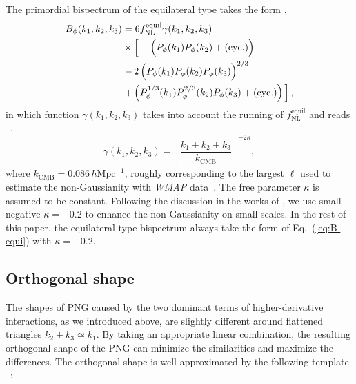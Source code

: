 \documentclass[twocolumn,floatfix,nofootinbib,aps,reprint]{revtex4}
\begin{document}
The primordial bispectrum 
of the equilateral type takes the form \cite{2006JCAP...05..004C},
\begin{equation}
    \begin{split}
        B_\phi(k_1, k_2, k_3) &= 6 f_\mathrm{NL}^\mathrm{equil}
        \gamma(k_1, k_2, k_3)\vphantom{P^{2/3}}\\
        &\times\left[\vphantom{P^{2/3}}
        -\left(\vphantom{P^{2/3}}
        P_\phi(k_1)P_\phi(k_2) + (\mathrm{cyc.})\right)
        \right.\\
        &\left. 
        -\,2\left(\vphantom{P^{2/3}}
        P_\phi(k_1)P_\phi(k_2)P_\phi(k_3)\right)^{2/3}
        \vphantom{P^{2/3}}\right. \\
        &\left.
        + \left(P_\phi^{1/3}(k_1)P_\phi^{2/3}(k_2)P_\phi(k_3) + 
        (\mathrm{cyc.}) \right)
        \vphantom{P^{2/3}}\right], \label{eq:B-equi}
    \end{split}
\end{equation}
in which function $\gamma(k_1, k_2, k_3)$ takes into account the running of $f_\mathrm{NL}^\mathrm{equil}$ and reads
~\cite{2008JCAP...04..014L},
\begin{equation}
    \gamma(k_1, k_2, k_3) = \left[\frac{k_1 + k_2 + k_3}{k_\mathrm{CMB}}
    \right]^{-2\kappa},
\end{equation}
where $k_\mathrm{CMB}=0.086\,h\mathrm{Mpc}^{-1}$, roughly 
corresponding to the largest $\ell$ used to estimate the non-Gaussianity
with {\it WMAP} data~\cite{2009ApJS..180..330K}.
The free parameter $\kappa$ is assumed to be constant. Following 
the discussion in the works of
\citep{2008JCAP...04..014L,2009MNRAS.394..133C}, 
we use small negative $\kappa=-0.2$ to enhance 
the non-Gaussianity on small scales. In the rest of this paper, 
the equilateral-type bispectrum always take the form of Eq.~(\ref{eq:B-equi})
with $\kappa=-0.2$.


\subsection{Orthogonal shape}
The shapes of PNG caused by the two dominant terms of higher-derivative 
interactions, as we introduced above, are slightly different around 
flattened triangles $k_2+k_3\simeq k_1$. By taking an appropriate 
linear combination, the resulting orthogonal shape of the PNG can minimize the 
similarities and maximize the differences. The orthogonal shape
is well approximated by the following template
~\cite{2015CRPhy..16..969R,2010JCAP...01..028S}:
\end{document}
